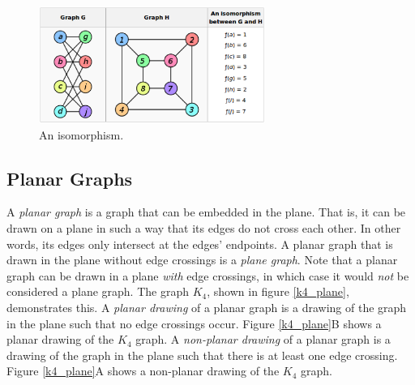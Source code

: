 \begin{figure}
	\centering
\includegraphics[height=1.5in]{isomorphism.eps}
\caption{An isomorphism.}
\label{isomorphism}
\end{figure}
\subsection{Planar Graphs}
A \emph{planar graph} is a graph that can be embedded in the plane.  That is, it can be drawn on a plane in such a way that its edges do not cross each other. In other words, its edges only intersect at the edges' endpoints. A planar graph that is drawn in the plane without edge crossings is a \emph{plane graph}. Note that a planar graph can be drawn in a plane \emph{with} edge crossings, in which case it would \emph{not} be considered a plane graph. The graph $K_4$, shown in figure \ref{k4_plane}, demonstrates this. A \emph{planar drawing} of a planar graph is a drawing of the graph in the plane such that no edge crossings occur. Figure \ref{k4_plane}B shows a planar drawing of the $K_4$ graph. A \emph{non-planar drawing} of a planar graph is a drawing of the graph in the plane such that there is at least one edge crossing. Figure \ref{k4_plane}A shows a non-planar drawing of the $K_4$ graph.

